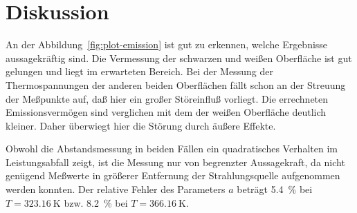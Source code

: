 \section{Diskussion}

An der Abbildung~\ref{fig:plot-emission} ist gut zu erkennen, welche
Ergebnisse aussagekräftig sind. Die Vermessung der schwarzen und weißen
Oberfläche ist gut gelungen und liegt im erwarteten Bereich. Bei der
Messung der Thermospannungen der anderen beiden Oberflächen fällt schon
an der Streuung der Meßpunkte auf, daß hier ein großer Störeinfluß
vorliegt. Die errechneten Emissionsvermögen sind verglichen mit dem der
weißen Oberfläche deutlich kleiner. Daher überwiegt hier die Störung
durch äußere Effekte.

Obwohl die Abstandsmessung in beiden Fällen ein quadratisches Verhalten
im Leistungsabfall zeigt, ist die Messung nur von begrenzter
Aussagekraft, da nicht genügend Meßwerte in größerer Entfernung der
Strahlungsquelle aufgenommen werden konnten. Der relative Fehler des
Parameters $a$ beträgt \SI{5.4}{\percent} bei $T = \SI{323.16}{\kelvin}$
bzw. \SI{8.2}{\percent} bei $T = \SI{366.16}{\kelvin}$.
